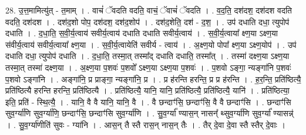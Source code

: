 \documentclass[17pt]{extarticle}
\begin{document}
28. उ॒त्त॒मामित्यु॑त् - त॒माम् । . वाचं॑ ॅवदति वदति॒ वाचं॒ ॅवाचं॑ ॅवदति । . व॒द॒ति॒ दश॑दश॒ दश॑दश वदति वदति॒ दश॑दश । . दश॑द॒शो पोप॒ दश॑दश॒ दश॑द॒शोप॑ । . दश॑द॒शेति॒ दश॑ - द॒श॒ । . उप॑ दधाति दधा॒ त्युपोप॑ दधाति । . द॒धा॒ति॒ स॒वी॒र्य॒त्वाय॑ सवीर्य॒त्वाय॑ दधाति दधाति सवीर्य॒त्वाय॑ । . स॒वी॒र्य॒त्वाया᳚ क्ष्ण॒या ऽक्ष्ण॒या स॑वीर्य॒त्वाय॑ सवीर्य॒त्वाया᳚ क्ष्ण॒या । . स॒वी॒र्य॒त्वायेति॑ सवीर्य - त्वाय॑ । . अ॒क्ष्ण॒यो पोपा᳚ क्ष्ण॒या ऽक्ष्ण॒योप॑ । . उप॑ दधाति दधा॒ त्युपोप॑ दधाति । . द॒धा॒ति॒ तस्मा॒त् तस्मा᳚द् दधाति दधाति॒ तस्मा᳚त् । . तस्मा॑ दक्ष्ण॒या ऽक्ष्ण॒या तस्मा॒त् तस्मा॑ दक्ष्ण॒या । . अ॒क्ष्ण॒या प॒शवः॑ प॒शवो᳚ ऽक्ष्ण॒या ऽक्ष्ण॒या प॒शवः॑ । . प॒शवो ऽङ्गा॒ न्यङ्गा॑नि प॒शवः॑ प॒शवो ऽङ्गा॑नि । . अङ्गा॑नि॒ प्र प्राङ्गा॒ न्यङ्गा॑नि॒ प्र । . प्र ह॑रन्ति हरन्ति॒ प्र प्र ह॑रन्ति । . ह॒र॒न्ति॒ प्रति॑ष्ठित्यै॒ प्रति॑ष्ठित्यै हरन्ति हरन्ति॒ प्रति॑ष्ठित्यै । . प्रति॑ष्ठित्यै॒ यानि॒ यानि॒ प्रति॑ष्ठित्यै॒ प्रति॑ष्ठित्यै॒ यानि॑ । . प्रति॑ष्ठित्या॒ इति॒ प्रति॑ - स्थि॒त्यै॒ । . यानि॒ वै वै यानि॒ यानि॒ वै । . वै छन्दाꣳ॑सि॒ छन्दाꣳ॑सि॒ वै वै छन्दाꣳ॑सि । . छन्दाꣳ॑सि सुव॒र्ग्या॑णि सुव॒र्ग्या॑णि॒ छन्दाꣳ॑सि॒ छन्दाꣳ॑सि सुव॒र्ग्या॑णि । . सु॒व॒र्ग्या᳚ ण्यास॒न् नासन्᳚ थ्सुव॒र्ग्या॑णि सुव॒र्ग्या᳚ ण्यासन्न्॑ । . सु॒व॒र्ग्या॑णीति॑ सुवः - ग्या॑नि । . आस॒न् तै स्तै रास॒न् नास॒न् तैः । . तैर् दे॒वा दे॒वा स्तै स्तैर् दे॒वाः । \newline
\end{document}
